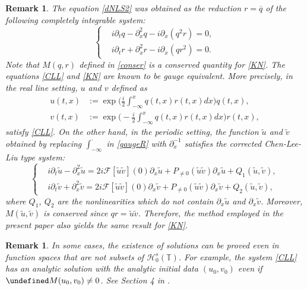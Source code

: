 \documentclass[%
11pt,  reqno]{amsart}
\newtheorem{remark}[theorem]{Remark}
\newcommand{\T}{\mathbb{T}}
\renewcommand{\H}{\mathcal H}
\newcommand{\Ft}{{\mathcal{F}}}
\newcommand{\wt}{\widetilde}
\newcommand{\cj}{\overline}
\newcommand{\dx}{\partial_x}
\newcommand{\dt}{\partial_t}
\newcommand{\nz}{P_{\neq 0}}
\numberwithin{equation}{section}
\numberwithin{theorem}{section}
\let\Im=\undefined\DeclareMathOperator*{\Im}{Im}
\begin{document}
\begin{remark}
\label{rem:gauge}
\rm
The equation \eqref{dNLS2} was obtained as the reduction $r = \cj q$ 
of the following completely integrable system:
\begin{equation}
\left\{
\begin{aligned}
&i \dt q - \dx^2 q - i \dx (q^2 r) = 0,
\\
&i \dt r + \dx^2 r - i \dx (q r^2) = 0.
\end{aligned}
\right.
\label{KN}
\end{equation}
Note that $M(q,r)$ defined in \eqref{conser} is a conserved quantity for \eqref{KN}.
The equations \eqref{CLL} and \eqref{KN} are known to be gauge equivalent.
More precisely, in the real line setting, $u$ and $v$ defined as
\begin{equation}
\begin{aligned}
u(t,x) &:= \exp \Big( \frac i2 \int_{-\infty}^x q(t,x) r(t,x) dx \Big) q(t,x),
\\
v(t,x) &:= \exp \Big(- \frac i2 \int_{-\infty}^x q(t,x) r(t,x) dx \Big) r(t,x),
\end{aligned}
\label{gaugeR}
\end{equation}
satisfy \eqref{CLL}. 
On the other hand, in the periodic setting, 
the function $\wt u$ and $\wt v$ obtained by replacing $\int_{-\infty}^\cdot$ in \eqref{gaugeR}
with $\dx^{-1}$ satisfies the corrected Chen-Lee-Liu type system: 
\begin{equation*}
\left\{
\begin{aligned}
&i \dt \wt u - \dx^2 \wt u = 2 i \Ft [\wt u \wt v](0) \dx \wt u 
+ \nz (\wt u \wt v) \dx \wt u + Q_1(\wt u , \wt v), 
\\
&i \dt \wt v + \dx^2 \wt v = 2 i \Ft [\wt u \wt v](0) \dx \wt v 
+ \nz (\wt u \wt v) \dx \wt v + Q_2(\wt u , \wt v),
\end{aligned}
\right.
\end{equation*}
where $Q_1$, $Q_2$ are the nonlinearities which do not contain $\dx \wt u$ and $\dx \wt v$.
Moreover, $M(\wt u, \wt v)$ is conserved since $q r = \wt u \wt v$.
Therefore, the method employed in the present paper also yields the same result for \eqref{KN}.
\end{remark}

\begin{remark}
\rm
In some cases, 
the existence of solutions can be proved even in function spaces 
that are not subsets of $\H_0^s(\T)$.
For example, 
the system \eqref{CLL} has an analytic solution with the analytic initial data $(u_0, v_0)$ 
even if $\Im M (u_0, v_0) \neq 0$. 
See Section 4 in \cite{KiTs18}. 
\end{remark}
\end{document}

